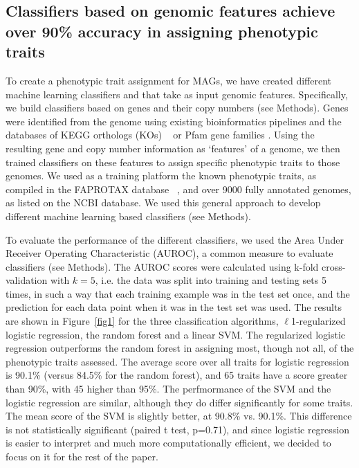 \documentclass[10pt,letterpaper]{article}
\begin{document}
\subsection*{Classifiers based on genomic features achieve over 90\% accuracy in assigning phenotypic traits}

To create a phenotypic trait assignment for MAGs, we have created different machine learning classifiers and that take as input genomic features.  Specifically, we build classifiers based on genes and their copy numbers (see Methods). Genes were identified from the genome using existing bioinformatics pipelines and the databases of KEGG orthologs (KOs) ~\cite{Kanehisa2017} or Pfam gene families \cite{Finn2016}. Using the resulting gene and copy number information as ‘features’ of a genome, we then trained classifiers on these features to assign specific phenotypic traits to those genomes. We used as a training platform the known phenotypic traits, as compiled in the FAPROTAX database ~\cite{Louca2016}, and over 9000 fully annotated genomes, as listed on the NCBI database. We used this general approach to develop different machine learning based classifiers (see Methods).  

To evaluate the performance of the different classifiers, we used the Area Under Receiver Operating Characteristic (AUROC), a common measure to evaluate classifiers (see Methods). The AUROC scores were calculated using k-fold cross-validation with $k=5$, i.e. the data was split into training and testing sets 5 times, in such a way that each training example was in the test set once, and the prediction for each data point when it was in the test set was used.  The results are shown in Figure~\ref{fig1} for the three classification algorithms, $\ell$1-regularized logistic regression, the random forest and a linear SVM. The regularized logistic regression outperforms the random forest in assigning most, though not all, of the phenotypic traits assessed.
The average score over all traits for logistic regression is 90.1\% (versus 84.5\% for the random forest), and 65 traits have a score greater than 90\%, with 45 higher than 95\%. The perfmormance of the SVM and the logistic regression are similar, although they do differ significantly for some traits. The mean score of the SVM is slightly better, at 90.8\% vs. 90.1\%. This difference is not statistically significant (paired t test, p=0.71), and since logistic regression is easier to interpret and much more computationally efficient, we decided to focus on it for the rest of the paper.
\end{document}
